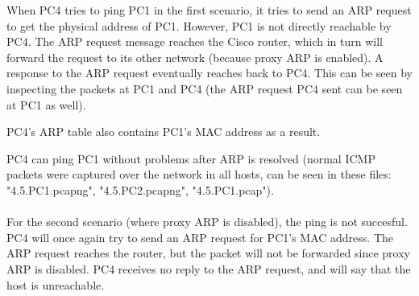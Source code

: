When PC4 tries to ping PC1 in the first scenario, it tries to send an ARP request to get the physical address of PC1. However, PC1 is not directly reachable by PC4. The ARP request message reaches the Cisco router, which in turn will forward the request to its other network (because proxy ARP is enabled). A response to the ARP request eventually reaches back to PC4. This can be seen by inspecting the packets at PC1 and PC4 (the ARP request PC4 sent can be seen at PC1 as well).




PC4's ARP table also contains PC1's MAC address as a result.


PC4 can ping PC1 without problems after ARP is resolved (normal ICMP packets were captured over the network in all hosts, can be seen in these files: "4.5.PC1.pcapng", "4.5.PC2.pcapng", "4.5.PC1.pcap"). \\ \\
For the second scenario (where proxy ARP is disabled), the ping is not succesful. PC4 will once again try to send an ARP request for PC1's MAC address. The ARP request reaches the router, but the packet will not be forwarded since proxy ARP is disabled. PC4 receives no reply to the ARP request, and will say that the host is unreachable.

